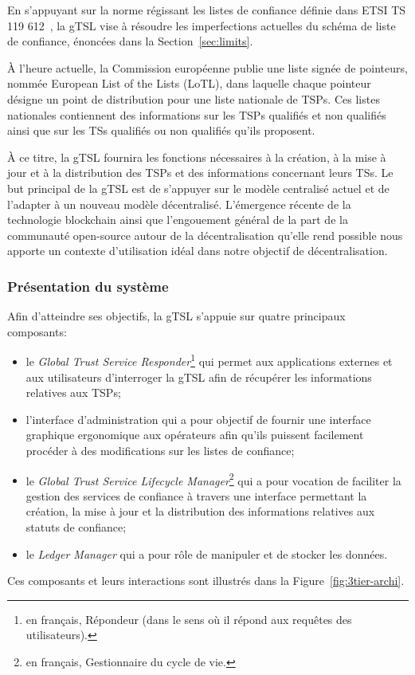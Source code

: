 \documentclass{tnreport}
\begin{document}
En s'appuyant sur la norme régissant les listes de confiance définie dans ETSI TS 119 612~\cite{ETSITS119612}, la gTSL vise à résoudre les imperfections actuelles du schéma de liste de confiance, énoncées dans la Section~\ref{sec:limits}. 

À l'heure actuelle, la Commission européenne publie une liste signée de pointeurs, nommée European List of the Lists (LoTL), dans laquelle chaque pointeur désigne un point de distribution pour une liste nationale de TSPs. 
Ces listes nationales contiennent des informations sur les TSPs qualifiés et non qualifiés ainsi que sur les TSs qualifiés ou non qualifiés qu'ils proposent.

À ce titre, la gTSL fournira les fonctions nécessaires à la création, à la mise à jour et à la distribution des TSPs et des informations concernant leurs TSs.
Le but principal de la gTSL est de s'appuyer sur le modèle centralisé actuel et de l'adapter à un nouveau modèle décentralisé.
L'émergence récente de la technologie blockchain ainsi que l'engouement général de la part de la communauté open-source autour de la décentralisation qu'elle rend possible nous apporte un contexte d'utilisation idéal dans notre objectif de décentralisation.

\subsubsection{Présentation du système}

Afin d'atteindre ses objectifs, la gTSL s'appuie sur quatre principaux composants:
\begin{itemize}	
	\item le \textit{Global Trust Service Responder}\footnote{en français, Répondeur (dans le sens où il répond aux requêtes des utilisateurs).} qui permet aux applications externes et aux utilisateurs d'interroger la gTSL afin de récupérer les informations relatives aux TSPs;
	\item l'interface d'administration qui a pour objectif de fournir une interface graphique ergonomique aux opérateurs afin qu'ils puissent facilement procéder à des modifications sur les listes de confiance;
	\item le \textit{Global Trust Service Lifecycle Manager}\footnote{en français, Gestionnaire du cycle de vie.} qui a pour vocation de faciliter la gestion des services de confiance à travers une interface permettant la création, la mise à jour et la distribution des informations relatives aux statuts de confiance;
	\item le \textit{Ledger Manager} qui a pour rôle de manipuler et de stocker les données.
	\newline
\end{itemize}
Ces composants et leurs interactions sont illustrés dans la Figure~\ref{fig:3tier-archi}.
\end{document}
